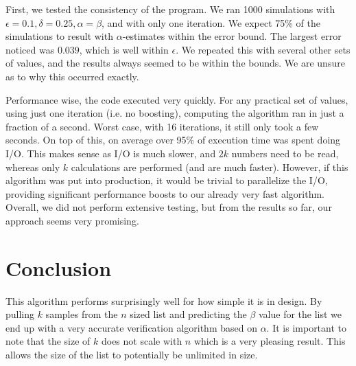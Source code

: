 \documentclass[11pt]{article}
\begin{document}
First, we tested the consistency of the program. We ran 1000 simulations with $\epsilon=0.1, \delta=0.25, \alpha=\beta$, and with only one iteration. We expect 75\% of the simulations to result with $\alpha$-estimates within the error bound. The largest error noticed was $0.039$, which is well within $\epsilon$. We repeated this with several other sets of values, and the results always seemed to be within the bounds. We are unsure as to why this occurred exactly.

Performance wise, the code executed very quickly. For any practical set of values, using just one iteration (i.e. no boosting), computing the algorithm ran in just a fraction of a second. Worst case, with 16 iterations, it still only took a few seconds. On top of this, on average over 95\% of execution time was spent doing I/O. This makes sense as I/O is much slower, and $2k$ numbers need to be read, whereas only $k$ calculations are performed (and are much faster). However, if this algorithm was put into production, it would be trivial to parallelize the I/O, providing significant performance boosts to our already very fast algorithm. Overall, we did not perform extensive testing, but from the results so far, our approach seems very promising.

\section{Conclusion}

This algorithm performs surprisingly well for how simple it is in design. By pulling $k$ samples from the $n$ sized list and predicting the $\beta$ value for the list we end up with a very accurate verification algorithm based on $\alpha$. It is important to note that the size of $k$ does not scale with $n$ which is a very pleasing result. This allows the size of the list to potentially be unlimited in size.  
\end{document}
